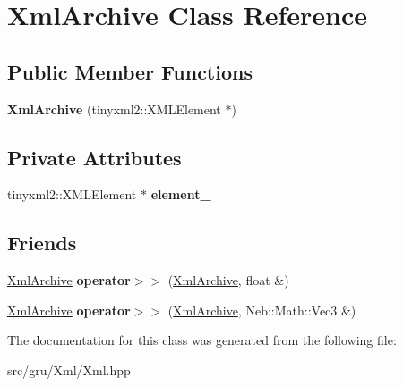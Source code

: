 \hypertarget{classXmlArchive}{\section{\-Xml\-Archive \-Class \-Reference}
\label{classXmlArchive}
}
\subsection*{\-Public \-Member \-Functions}
\begin{DoxyCompactItemize}
\item 
\hypertarget{classXmlArchive_af60507762c0e126c686ba370b502c519}{{\bfseries \-Xml\-Archive} (tinyxml2\-::\-X\-M\-L\-Element $\ast$)}\label{classXmlArchive_af60507762c0e126c686ba370b502c519}

\end{DoxyCompactItemize}
\subsection*{\-Private \-Attributes}
\begin{DoxyCompactItemize}
\item 
\hypertarget{classXmlArchive_a9cc9a554d9a42141a9f51bf9cfa9eca5}{tinyxml2\-::\-X\-M\-L\-Element $\ast$ {\bfseries element\-\_\-}}\label{classXmlArchive_a9cc9a554d9a42141a9f51bf9cfa9eca5}

\end{DoxyCompactItemize}
\subsection*{\-Friends}
\begin{DoxyCompactItemize}
\item 
\hypertarget{classXmlArchive_ac00483f1bd65b3d880d13399bdf383a1}{\hyperlink{classXmlArchive}{\-Xml\-Archive} {\bfseries operator$>$$>$} (\hyperlink{classXmlArchive}{\-Xml\-Archive}, float \&)}\label{classXmlArchive_ac00483f1bd65b3d880d13399bdf383a1}

\item 
\hypertarget{classXmlArchive_ada2eb5f73207ee6133a5f6876c0bbe79}{\hyperlink{classXmlArchive}{\-Xml\-Archive} {\bfseries operator$>$$>$} (\hyperlink{classXmlArchive}{\-Xml\-Archive}, \-Neb\-::\-Math\-::\-Vec3 \&)}\label{classXmlArchive_ada2eb5f73207ee6133a5f6876c0bbe79}

\end{DoxyCompactItemize}


\-The documentation for this class was generated from the following file\-:\begin{DoxyCompactItemize}
\item 
src/gru/\-Xml/\-Xml.\-hpp\end{DoxyCompactItemize}
